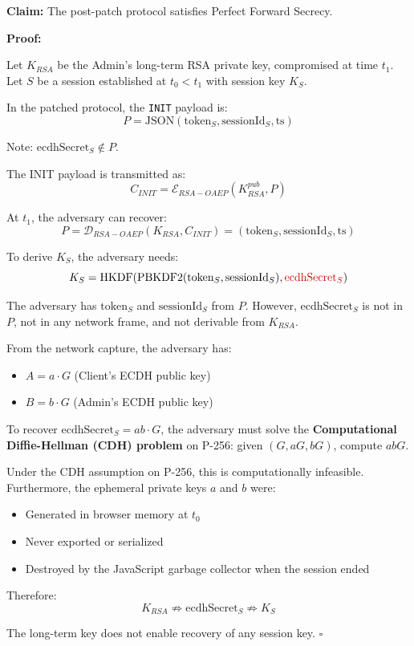 \documentclass[12pt,a4paper]{article}
\begin{document}
\begin{proofbox}
\textbf{Claim:} The post-patch protocol satisfies Perfect Forward Secrecy.

\textbf{Proof:}

Let $K_{RSA}$ be the Admin's long-term RSA private key, compromised at time $t_1$. Let $S$ be a session established at $t_0 < t_1$ with session key $K_S$.

In the patched protocol, the \texttt{INIT} payload is:
$$P = \text{JSON}(\text{token}_S, \text{sessionId}_S, \text{ts})$$

Note: $\text{ecdhSecret}_S \notin P$.

The INIT payload is transmitted as:
$$C_{INIT} = \mathcal{E}_{RSA-OAEP}(K_{RSA}^{pub}, P)$$

At $t_1$, the adversary can recover:
$$P = \mathcal{D}_{RSA-OAEP}(K_{RSA}, C_{INIT}) = (\text{token}_S, \text{sessionId}_S, \text{ts})$$

To derive $K_S$, the adversary needs:
$$K_S = \text{HKDF}(\text{PBKDF2}(\text{token}_S, \text{sessionId}_S), \textcolor{criticalred}{\text{ecdhSecret}_S})$$

The adversary has $\text{token}_S$ and $\text{sessionId}_S$ from $P$. However, $\text{ecdhSecret}_S$ is not in $P$, not in any network frame, and not derivable from $K_{RSA}$.

From the network capture, the adversary has:
\begin{itemize}
    \item $A = a \cdot G$ (Client's ECDH public key)
    \item $B = b \cdot G$ (Admin's ECDH public key)
\end{itemize}

To recover $\text{ecdhSecret}_S = ab \cdot G$, the adversary must solve the \textbf{Computational Diffie-Hellman (CDH) problem} on P-256: given $(G, aG, bG)$, compute $abG$.

Under the CDH assumption on P-256, this is computationally infeasible. Furthermore, the ephemeral private keys $a$ and $b$ were:
\begin{itemize}
    \item Generated in browser memory at $t_0$
    \item Never exported or serialized
    \item Destroyed by the JavaScript garbage collector when the session ended
\end{itemize}

Therefore:
$$K_{RSA} \not\Rightarrow \text{ecdhSecret}_S \not\Rightarrow K_S$$

The long-term key does not enable recovery of any session key. $\square$
\end{proofbox}
\end{document}
